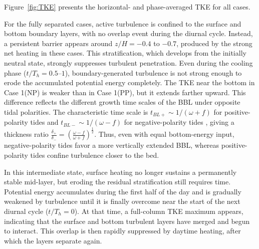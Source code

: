 \documentclass[draft]{agujournal2019}
\let\cite\shortcite
\begin{document}
Figure~\ref{fig:TKE} presents the horizontal- and phase-averaged TKE for all cases. 

For the fully separated cases, active turbulence is confined to the surface and bottom boundary layers, with no overlap event during the diurnal cycle. Instead, a persistent barrier appears around $z/H=-0.4$ to $-0.7$, produced by the strong net heating in these cases. This stratification, which develops from the initially neutral state, strongly suppresses turbulent penetration. Even during the cooling phase ($t/T_h = 0.5$--$1$), boundary-generated turbulence is not strong enough to erode the accumulated potential energy completely. The TKE near the bottom in Case 1(NP) is weaker than in Case 1(PP), but it extends farther upward. This difference reflects the different growth time scales of the BBL under opposite tidal polarities. The characteristic time scale is $t_{BL+}\sim1/(\omega+f)$ for positive-polarity tides and $t_{BL-}\sim1/(\omega-f)$ for negative-polarity tides \cite{Simpson2009}, giving a thickness ratio $\frac{\delta_+}{\delta_-}=(\frac{\omega-f}{\omega+f})^{\frac{1}{2}}$. Thus, even with equal bottom-energy input, negative-polarity tides favor a more vertically extended BBL, whereas positive-polarity tides confine turbulence closer to the bed.

 In this intermediate state, surface heating no longer sustains a permanently stable mid-layer, but eroding the residual stratification still requires time. Potential energy accumulates during the first half of the day and is gradually weakened by turbulence until it is finally overcome near the start of the next diurnal cycle ($t/T_h=0$). At that time, a full-column TKE maximum appears, indicating that the surface and bottom turbulent layers have merged and begun to interact. This overlap is then rapidly suppressed by daytime heating, after which the layers separate again.
\end{document}
